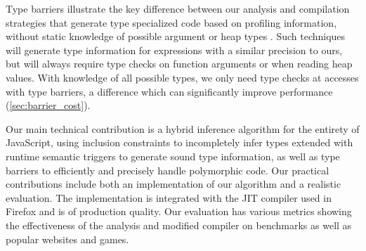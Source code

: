 Type barriers illustrate the key difference between our analysis and
compilation strategies that generate type specialized code based on profiling
information, without static knowledge of possible argument or heap types
\cite{ChambersThesis, Chambers89}.
Such techniques will generate type information for expressions with a
similar precision to ours,
but will always require type checks on function arguments or when reading
heap values.
With knowledge of all possible types, we only need type checks at accesses
with type barriers, a difference which can significantly improve performance
(\Section\ref{sec:barrier_cost}).

Our main technical contribution is a hybrid inference algorithm for the
entirety of JavaScript, using inclusion constraints to incompletely infer
types extended with runtime semantic triggers to generate sound type
information, as well as type barriers to efficiently and precisely handle
polymorphic code. Our practical contributions include both an
implementation of our algorithm and a realistic evaluation. The implementation
is integrated with the JIT compiler used in Firefox and is of production
quality. Our evaluation has various metrics showing the effectiveness of the
analysis and modified compiler on benchmarks as well as popular websites and games.







